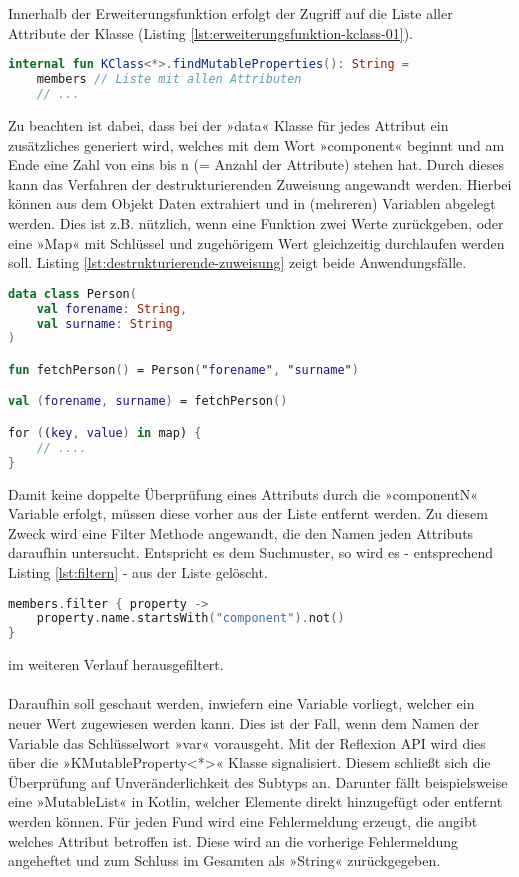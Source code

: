 \\\\
Innerhalb der Erweiterungsfunktion erfolgt der Zugriff auf die Liste aller Attribute der Klasse (Listing
\ref{lst:erweiterungsfunktion-kclass-01}).
\begin{lstlisting}[caption={Erweiterungsfunktion »KClass« mit Liste aller Attribute}, label={lst:erweiterungsfunktion-kclass-01}, language=Kotlin]
internal fun KClass<*>.findMutableProperties(): String =
	members // Liste mit allen Attributen
	// ...
\end{lstlisting}
\bigskip
Zu beachten ist dabei, dass bei der »data« Klasse für jedes Attribut ein zusätzliches generiert wird, welches mit dem Wort »component« beginnt und am Ende eine Zahl von eins bis n (= Anzahl der Attribute) stehen hat. Durch dieses kann das Verfahren der destrukturierenden Zuweisung angewandt werden. Hierbei können aus dem Objekt Daten extrahiert und in (mehreren) Variablen abgelegt werden. Dies ist z.B. nützlich, wenn eine Funktion zwei Werte zurückgeben, oder eine »Map« mit Schlüssel und zugehörigem Wert gleichzeitig durchlaufen werden soll. Listing
\ref{lst:destrukturierende-zuweisung}
zeigt beide Anwendungsfälle.
\begin{lstlisting}[caption={Destrukturierende Zuweisung}, label={lst:destrukturierende-zuweisung}, language=Kotlin]
data class Person(
	val forename: String,
	val surname: String
)

fun fetchPerson() = Person("forename", "surname")

val (forename, surname) = fetchPerson()

for ((key, value) in map) {
	// .... 
}
\end{lstlisting}
Damit keine doppelte Überprüfung eines Attributs durch die »componentN« Variable erfolgt, müssen diese vorher aus der Liste entfernt werden. Zu diesem Zweck wird eine Filter Methode angewandt, die den Namen jeden Attributs daraufhin untersucht. Entspricht es dem Suchmuster, so wird es - entsprechend Listing 
\ref{lst:filtern}
- aus der Liste gelöscht.
\begin{lstlisting}[caption={Filtern}, label={lst:filtern}, language=Kotlin] 
members.filter { property -> 
	property.name.startsWith("component").not() 
}
\end{lstlisting}
\bigskip
im weiteren Verlauf herausgefiltert. 
\\\\
Daraufhin soll geschaut werden, inwiefern eine Variable vorliegt, welcher ein neuer Wert zugewiesen werden kann. Dies ist der Fall, wenn dem Namen der Variable das Schlüsselwort »var« vorausgeht. Mit der Reflexion API wird dies über die »KMutableProperty<*>« Klasse signalisiert. Diesem schließt sich die Überprüfung auf Unveränderlichkeit des Subtyps an. Darunter fällt beispielsweise eine »MutableList« in Kotlin, welcher Elemente direkt hinzugefügt oder entfernt werden können. Für jeden Fund wird eine Fehlermeldung erzeugt, die angibt welches Attribut betroffen ist. Diese wird an die vorherige Fehlermeldung angeheftet und zum Schluss im Gesamten als »String« zurückgegeben.
